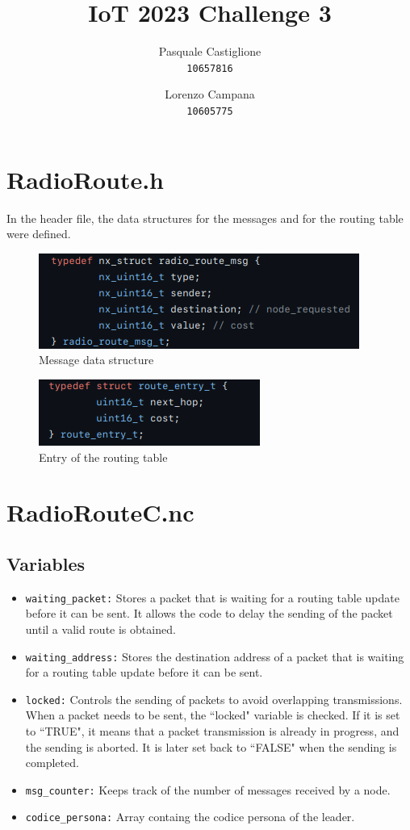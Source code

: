 \documentclass[11pt]{article}
\title{\textbf{IoT 2023 Challenge 3}}
\author{
  Pasquale Castiglione\\
	\texttt{10657816}
  \and
  Lorenzo Campana\\
  \texttt{10605775}
}
\date{}
\begin{document}
\maketitle

\section*{RadioRoute.h}
In the header file, the data structures for the messages and for the routing table were defined.
\begin{figure}[h]
\includegraphics[scale=0.5]{msg.png}
\caption{Message data structure}
\end{figure}
\begin{figure}[h]
\includegraphics[scale=0.5]{entry.png}
\caption{Entry of the routing table}
\end{figure}

\section*{RadioRouteC.nc}
\subsection*{Variables} 
\begin{itemize}
	\item{\texttt{waiting\_packet:}} Stores a packet that is waiting for a routing table update before it can be sent. It allows the code to delay the sending of the packet until a valid route is obtained.
	\item{\texttt{waiting\_address:}} Stores the destination address of a packet that is waiting for a routing table update before it can be sent.
	\item{\texttt{locked:}} Controls the sending of packets to avoid overlapping transmissions. When a packet needs to be sent, the ``locked" variable is checked. If it is set to ``TRUE", it means that a packet transmission is already in progress, and the sending is aborted. It is later set back to ``FALSE" when the sending is completed.
	\item{\texttt{msg\_counter:}} Keeps track of the number of messages received by a node.
	\item{\texttt{codice\_persona:}} Array containg the codice persona of the leader.

\end{itemize}
\end{document}
